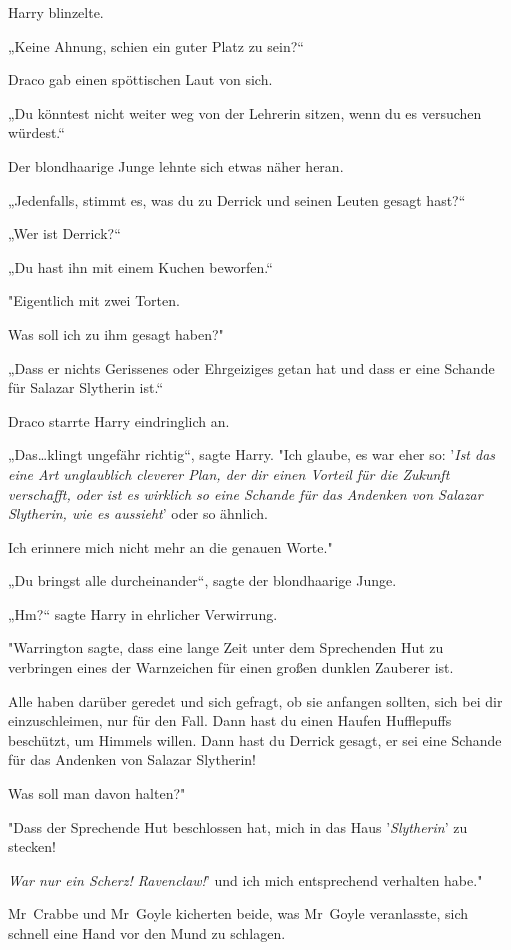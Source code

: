 {Harry blinzelte.

„Keine Ahnung, schien ein guter Platz zu sein?“

Draco gab einen spöttischen Laut von sich.

„Du könntest nicht weiter weg von der Lehrerin sitzen, wenn du es versuchen würdest.“

Der blondhaarige Junge lehnte sich etwas näher heran.

„Jedenfalls, stimmt es, was du zu Derrick und seinen Leuten gesagt hast?“

„Wer ist Derrick?“

„Du hast ihn mit einem Kuchen beworfen.“

"Eigentlich mit zwei Torten.

Was soll ich zu ihm gesagt haben?"

„Dass er nichts Gerissenes oder Ehrgeiziges getan hat und dass er eine Schande für Salazar Slytherin ist.“

Draco starrte Harry eindringlich an.

„Das…klingt ungefähr richtig“, sagte Harry. "Ich glaube, es war eher so: '\emph{Ist das eine Art unglaublich cleverer Plan, der dir einen Vorteil für die Zukunft verschafft, oder ist es wirklich so eine Schande für das Andenken von Salazar Slytherin, wie es aussieht}' oder so ähnlich.

Ich erinnere mich nicht mehr an die genauen Worte."

„Du bringst alle durcheinander“, sagte der blondhaarige Junge.

„Hm?“ sagte Harry in ehrlicher Verwirrung.

"Warrington sagte, dass eine lange Zeit unter dem Sprechenden Hut zu verbringen eines der Warnzeichen für einen großen dunklen Zauberer ist.

Alle haben darüber geredet und sich gefragt, ob sie anfangen sollten, sich bei dir einzuschleimen, nur für den Fall. Dann hast du einen Haufen Hufflepuffs beschützt, um Himmels willen. Dann hast du Derrick gesagt, er sei eine Schande für das Andenken von Salazar Slytherin!

Was soll man davon halten?"

"Dass der Sprechende Hut beschlossen hat, mich in das Haus '\emph{Slytherin}' zu stecken!

\emph{War nur ein Scherz! Ravenclaw!}' und ich mich entsprechend verhalten habe."

Mr~Crabbe und Mr~Goyle kicherten beide, was Mr~Goyle veranlasste, sich schnell eine Hand vor den Mund zu schlagen.

}
